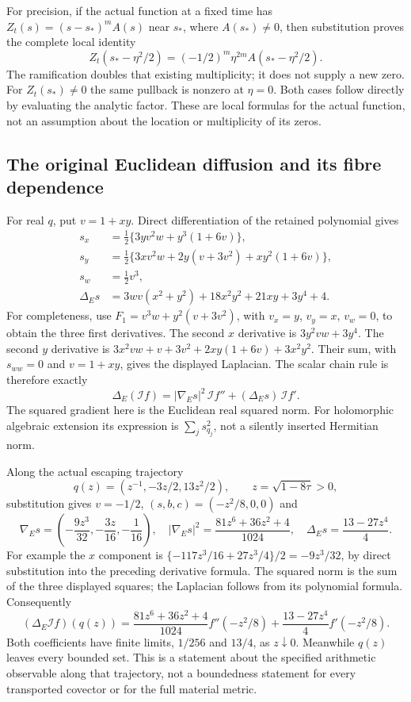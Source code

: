 For precision, if the actual function at a fixed time has
$Z_t(s)=(s-s_*)^m A(s)$ near $s_*$, where $A(s_*)\ne0$, then
substitution proves the complete local identity
\[
 Z_t(s_*-\eta^2/2)=(-1/2)^m\eta^{2m}A(s_*-\eta^2/2).
\]
The ramification doubles that existing multiplicity; it does not
supply a new zero. For $Z_t(s_*)\ne0$ the same pullback is nonzero
at $\eta=0$. Both cases follow directly by evaluating the analytic
factor. These are local formulas for the actual function, not
an assumption about the location or multiplicity of its zeros.

\subsection{The original Euclidean diffusion and its fibre dependence}

For real $q$, put $v=1+xy$. Direct differentiation of the retained
polynomial gives
\begin{align*}
 s_x&=\tfrac12\{3yv^2w+y^3(1+6v)\},\\
 s_y&=\tfrac12\{3xv^2w+2y(v+3v^2)+xy^2(1+6v)\},\\
 s_w&=\tfrac12v^3,\\
 \Delta_Es&=3wv(x^2+y^2)+18x^2y^2+21xy+3y^4+4.
\end{align*}
For completeness, use $F_1=v^3w+y^2(v+3v^2)$, with
$v_x=y$, $v_y=x$, $v_w=0$, to obtain the three first derivatives.
The second $x$ derivative is $3y^2vw+3y^4$.
The second $y$ derivative is
$3x^2vw+v+3v^2+2xy(1+6v)+3x^2y^2$.
Their sum, with $s_{ww}=0$ and $v=1+xy$, gives the displayed
Laplacian. The scalar chain rule is therefore exactly
\begin{equation}
 \Delta_E(\mathcal I f)
 =|\nabla_Es|^2\,\mathcal I f''+(\Delta_Es)\,\mathcal I f'.
 \label{eq:mag-Euclidean-diffusion}
\end{equation}
The squared gradient here is the Euclidean real squared norm. For
holomorphic algebraic extension its expression is $\sum_j s_{q_j}^2$,
not a silently inserted Hermitian norm.

Along the actual escaping trajectory
\[
 q(z)=(z^{-1},-3z/2,13z^2/2),\qquad
 z=\sqrt{1-8\tau}>0,
\]
substitution gives $v=-1/2$, $(s,b,c)=(-z^2/8,0,0)$ and
\begin{equation}
 \nabla_Es=\left(-\frac{9z^3}{32},-\frac{3z}{16},-\frac1{16}\right),
 \quad |\nabla_Es|^2=\frac{81z^6+36z^2+4}{1024},
 \quad \Delta_Es=\frac{13-27z^4}{4}.
 \label{eq:mag-orbit-diffusion}
\end{equation}
For example the $x$ component is
$\{-117z^3/16+27z^3/4\}/2=-9z^3/32$,
by direct substitution into the preceding derivative formula.
The squared norm is the sum of the three
displayed squares; the Laplacian follows from its polynomial formula.
Consequently
\[
 (\Delta_E\mathcal I f)(q(z))
 =\frac{81z^6+36z^2+4}{1024}f''(-z^2/8)
       +\frac{13-27z^4}{4}f'(-z^2/8).
\]
Both coefficients have finite limits, $1/256$ and $13/4$, as
$z\downarrow0$. Meanwhile $q(z)$ leaves every bounded set.
This is a statement about the specified arithmetic observable along
that trajectory, not a boundedness statement for every transported
covector or for the full material metric.

